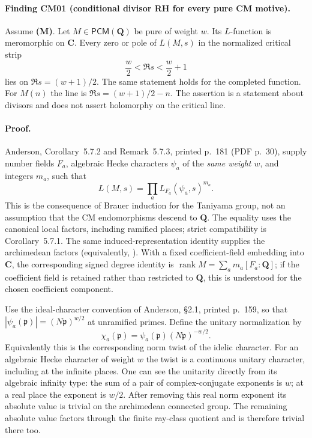 \documentclass[11pt,a4paper]{article}
\theoremstyle{definition}
\begin{document}
\paragraph{Finding CM01 (conditional divisor RH for every pure CM motive).}
Assume \textbf{(M)}. Let $M\in\mathsf{PCM}(\mathbf Q)$ be pure of weight $w$.
Its $L$-function is meromorphic on $\mathbf C$. Every zero or pole of
$L(M,s)$ in the normalized critical strip
\[
            \frac w2<\Re s<\frac w2+1
\]
lies on $\Re s=(w+1)/2$. The same statement holds for the completed function.
For $M(n)$ the line is $\Re s=(w+1)/2-n$.
The assertion is a statement about divisors and does not assert
holomorphy on the critical line.

\paragraph{Proof.}
Anderson, Corollary~5.7.2 and Remark~5.7.3, printed p.~181
(PDF p.~30), supply number fields $F_a$, algebraic Hecke characters
$\psi_a$ of the \emph{same weight $w$}, and integers $m_a$, such that
\begin{equation}\label{eq:cm-factorization}
 L(M,s)=\prod_a L_{F_a}(\psi_a,s)^{m_a}.
\end{equation}
This is the consequence of Brauer induction for the Taniyama group,
not an assumption that the CM endomorphisms descend to $\mathbf Q$.
The equality uses the canonical local factors, including ramified places;
strict compatibility is Corollary~5.7.1. The same induced-representation
identity supplies the archimedean factors (equivalently,
\cite[\S7.1, Theorem~7.1; \S7.2, Corollaries~7.6 and~7.9]{FarguesCM}).
With a fixed coefficient-field embedding into $\mathbf C$, the corresponding
signed degree identity is
$\operatorname{rank}M=\sum_a m_a[F_a:\mathbf Q]$; if the coefficient
field is retained rather than restricted to $\mathbf Q$, this is understood
for the chosen coefficient component.

Use the ideal-character convention of Anderson, \S2.1, printed p.~159,
so that
$|\psi_a(\mathfrak p)|=(N\mathfrak p)^{w/2}$ at unramified primes.
Define the unitary normalization by
\[
 \chi_a(\mathfrak p)=\psi_a(\mathfrak p)(N\mathfrak p)^{-w/2}.
\]
Equivalently this is the corresponding norm twist of the idelic character.
For an algebraic Hecke character of weight $w$ the twist is a continuous
unitary character, including at the infinite places. One can see the
unitarity directly from its algebraic infinity type: the sum of a pair of
complex-conjugate exponents is $w$; at a real place the exponent is $w/2$.
After removing this real norm exponent its absolute value is trivial on
the archimedean connected group. The remaining absolute value factors
through the finite ray-class quotient and is therefore trivial there too.
\end{document}
